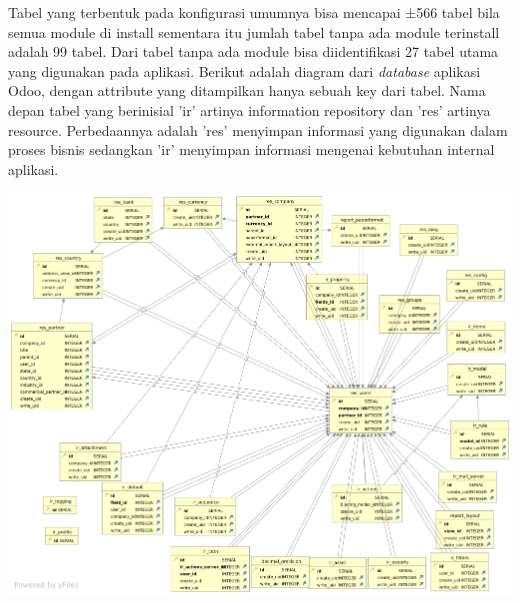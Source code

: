 Tabel yang terbentuk pada konfigurasi umumnya bisa mencapai ±566 tabel bila semua module di install sementara itu jumlah tabel tanpa ada module terinstall adalah 99 tabel. Dari tabel tanpa ada module bisa diidentifikasi 27 tabel utama yang digunakan pada aplikasi. Berikut adalah diagram dari \textit{database} aplikasi Odoo, dengan attribute yang ditampilkan hanya sebuah key dari tabel. Nama depan tabel yang berinisial 'ir' artinya information repository dan 'res' artinya resource. Perbedaannya adalah 'res' menyimpan informasi yang digunakan dalam proses bisnis sedangkan 'ir' menyimpan informasi mengenai kebutuhan internal aplikasi.
 
\begin{center}
	\includegraphics[width=14cm]{img/OdooCoreERD.png}
	\label{fig:asd}
\end{center}



